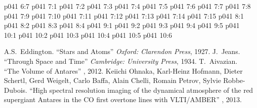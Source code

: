 \vs p041 6:7 \pc 
{}
\vs p041 7:1 
\vs p041 7:2 
\vs p041 7:3 \pc 
\vs p041 7:4 
\vs p041 7:5 
\vs p041 7:6 
\vs p041 7:7 
\vs p041 7:8 
\vs p041 7:9 
\vs p041 7:10 
\vs p041 7:11 \pc 
\vs p041 7:12 \pc 
\vs p041 7:13 
\vs p041 7:14 \pc 
\vs p041 7:15 
\vs p041 8:1 
\vs p041 8:2 \pc 
\vs p041 8:3 \pc 
\vs p041 8:4 
\vs p041 9:1 
\vs p041 9:2 \pc 
\vs p041 9:3 \pc 
\vs p041 9:4 
\vs p041 9:5 
\vs p041 10:1 
\vs p041 10:2 
\vs p041 10:3 \pc 
\vs p041 10:4 
\vs p041 10:5 \pc 
\vsetoff
\vs p041 10:6 
\quizlink
\begin{thebibliography}{100}
A.S.~Eddington.
{``Stars and Atoms''}
{\em Oxford: Clarendon Press}, 1927.
J.~Jeans.
{``Through Space and Time''}
{\em Cambridge: University Press}, 1934.
T.~Aivazian.
{``The Volume of Antares''}
{\em {}}, 2012.
Keiichi Ohnaka, Karl-Heinz Hofmann, Dieter Schertl, Gerd Weigelt, Carlo Baffa, Alain Chelli, Romain Petrov, Sylvie Robbe-Dubois.
{``High spectral resolution imaging of the dynamical atmosphere of the red supergiant Antares in the CO first overtone lines with VLTI/AMBER''}
{\em {}}, 2013.
\end{thebibliography}
